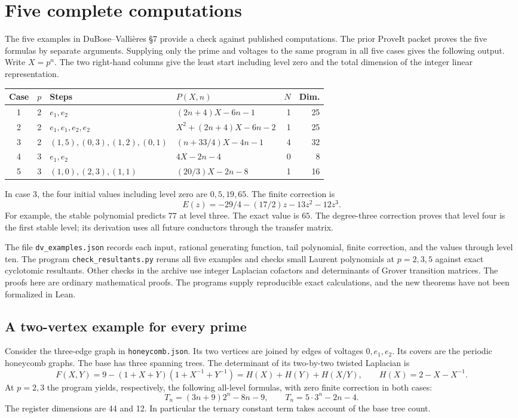 \section{Five complete computations}
The five examples in DuBose--Vallières \S7 provide a check against published computations. The prior ProveIt packet proves the five formulas by separate arguments. Supplying only the prime and voltages to the same program in all five cases gives the following output. Write $X=p^n$. The two right-hand columns give the least start including level zero and the total dimension of the integer linear representation.
\begin{center}\small
\begin{tabular}{@{}ccp{.31\linewidth}lrr@{}}
\toprule
Case & $p$ & Steps & $P(X,n)$ & $N$ & Dim.\\
\midrule
1&2&$e_1,e_2$&$(2n+4)X-6n-1$ &1&25\\
2&2&$e_1,e_1,e_2,e_2$&$X^2+(2n+4)X-6n-2$ &1&25\\
3&2&$(1,5),(0,3),(1,2),(0,1)$&$(n+33/4)X-4n-1$ &4&32\\
4&3&$e_1,e_2$&$4X-2n-4$ &0&8\\
5&3&$(1,0),(2,3),(1,1)$&$(20/3)X-2n-8$ &1&16\\
\bottomrule
\end{tabular}
\end{center}
In case 3, the four initial values including level zero are $0,5,19,65$. The finite correction is
\[
 E(z)=-29/4-(17/2)z-13z^2-12z^3.
\]
For example, the stable polynomial predicts $77$ at level three. The exact value is $65$. The degree-three correction proves that level four is the first stable level; its derivation uses all future conductors through the transfer matrix.

The file \texttt{dv\_examples.json} records each input, rational generating function, tail polynomial, finite correction, and the values through level ten.
The program \texttt{check\_resultants.py} reruns all five examples and checks small Laurent polynomials at $p=2,3,5$ against exact cyclotomic resultants. Other checks in the archive use integer Laplacian cofactors and determinants of Grover transition matrices. The proofs here are ordinary mathematical proofs. The programs supply reproducible exact calculations, and the new theorems have not been formalized in Lean.

\subsection*{A two-vertex example for every prime}
Consider the three-edge graph in \texttt{honeycomb.json}. Its two vertices are joined by edges of voltages $0,e_1,e_2$. Its covers are the periodic honeycomb graphs. The base has three spanning trees. The determinant of its two-by-two twisted Laplacian is
\[
 F(X,Y)=9-(1+X+Y)(1+X^{-1}+Y^{-1})
        =H(X)+H(Y)+H(X/Y),\qquad H(X)=2-X-X^{-1}.
\]
At $p=2,3$ the program yields, respectively, the following all-level formulas, with zero finite correction in both cases:
\[
 T_n=(3n+9)2^n-8n-9,\qquad T_n=5\cdot3^n-2n-4 .
\]
The register dimensions are 44 and 12. In particular the ternary constant term takes account of the base tree count.

